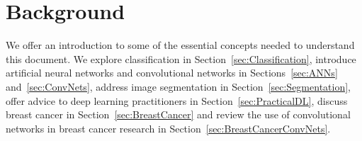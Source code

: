 \chapter{Background}
\label{ch:Background}
We offer an introduction to some of the essential concepts needed to understand this document. 
We explore classification in Section~\ref{sec:Classification}, introduce artificial neural networks and convolutional networks in Sections~\ref{sec:ANNs} and~\ref{sec:ConvNets}, address image segmentation in Section~\ref{sec:Segmentation}, offer advice to deep learning practitioners in Section~\ref{sec:PracticalDL}, discuss breast cancer in Section~\ref{sec:BreastCancer} and review the use of convolutional networks in breast cancer research in Section~\ref{sec:BreastCancerConvNets}.

\begin{comment}
We start exploring basic concepts about classification and evaluation metrics in Section~\ref{sec:Classification}, Sections~\ref{sec:ANNs} and~\ref{sec:ConvNets} introduce artificial neural networks and convolutional networks, image segmentation is discussed in Section~\ref{sec:Segmentation}, Section~\ref{sec:PracticalDL} offers advice to deep learning practitioners, Section~\ref{sec:BreastCancer} adresses breast cancer and mammography and, lastly, Section~\ref{sec:BreastCancerConvNets} overviews how convolutional networks have been used in breast cancer research.

We start exploring basic concepts about classification and evaluation metrics (Sec.~\ref{sec:Classification}), introduce artificial neural networks (Sec.~\ref{sec:ANNs})cand convolutional networks (Sec.~\ref{sec:ConvNets}), discuss image segmentation (Sec.~\ref{sec:Segmentation}), offer advice to deep learning practitioners (Sec.~\ref{sec:PracticalDL}), adress breast cancer and mammography (Sec.~\ref{sec:BreastCancer}) and, lastly, overview how convolutional networks have been used in breast cancer research (Sec.~\ref{sec:BreastCancerConvNets}).

We offer an introduction to some of the essential concepts needed to understand the rest of this document. We start by discussing breast cancer and mammograms in Section~\ref{sec:BreastCancer}, we explore some basic concepts about classification and evaluation metrics in Section~\ref{sec:Classification}, in Sections~\ref{sec:ANNs} and~\ref{sec:ConvNets} we give a short introduction into artificial neural networks and convolutional networks, image segmentation is adressed in Section~\ref{sec:Segmentation}, we offer advice for deep learning practitioners in Section~\ref{sec:PracticalDL} and, finally, we present an overview of how convolutional networks have been used for breast cancer research in Section~\ref{sec:BreastCancerConvNets}.
\end{comment}


